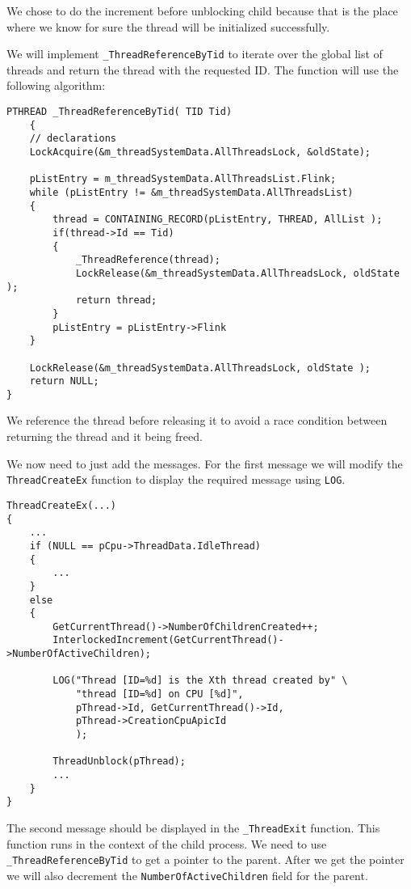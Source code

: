  We chose to do the increment before unblocking child because that is the place where we know for sure the thread will be initialized successfully. 
 
 We will implement \lstinline|_ThreadReferenceByTid| to iterate over the global list of threads and return the thread with the requested ID. The function will use the following algorithm:
 
 \begin{lstlisting}
PTHREAD _ThreadReferenceByTid( TID Tid)
    {
    // declarations
    LockAcquire(&m_threadSystemData.AllThreadsLock, &oldState);

    pListEntry = m_threadSystemData.AllThreadsList.Flink;
    while (pListEntry != &m_threadSystemData.AllThreadsList)
    {
        thread = CONTAINING_RECORD(pListEntry, THREAD, AllList );
        if(thread->Id == Tid)
        {
            _ThreadReference(thread);
            LockRelease(&m_threadSystemData.AllThreadsLock, oldState );
            return thread;
        }
        pListEntry = pListEntry->Flink
    }

    LockRelease(&m_threadSystemData.AllThreadsLock, oldState );
    return NULL;
}
 \end{lstlisting}
 We reference the thread before releasing it to avoid a race condition between returning the thread and it being freed.
 
 We now need to just add the messages. For the first message we will modify the \lstinline|ThreadCreateEx| function to display the required message using \lstinline|LOG|.
 
 \begin{lstlisting}
ThreadCreateEx(...)
{
    ... 
    if (NULL == pCpu->ThreadData.IdleThread)
    {
        ...
    }
    else
    {
        GetCurrentThread()->NumberOfChildrenCreated++; 
        InterlockedIncrement(GetCurrentThread()->NumberOfActiveChildren);
        
        LOG("Thread [ID=%d] is the Xth thread created by" \
            "thread [ID=%d] on CPU [%d]",
            pThread->Id, GetCurrentThread()->Id, 
            pThread->CreationCpuApicId
            );
        
        ThreadUnblock(pThread);
        ... 
    }
}

\end{lstlisting}
 
The second message should be displayed in the \lstinline{_ThreadExit} function. This function runs in the context of the child process. We need to use \lstinline|_ThreadReferenceByTid| to get a pointer to the parent. After we get the pointer we will also decrement the \lstinline|NumberOfActiveChildren| field for the parent.

